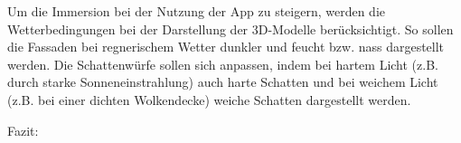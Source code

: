 Um die Immersion bei der Nutzung der App zu steigern, werden die Wetterbedingungen bei der Darstellung der 3D-Modelle berücksichtigt. So sollen die Fassaden bei regnerischem Wetter dunkler und feucht bzw. nass dargestellt werden. Die Schattenwürfe sollen sich anpassen, indem bei hartem Licht (z.B. durch starke Sonneneinstrahlung) auch harte Schatten und bei weichem Licht (z.B. bei einer dichten Wolkendecke) weiche Schatten dargestellt werden.

Fazit: